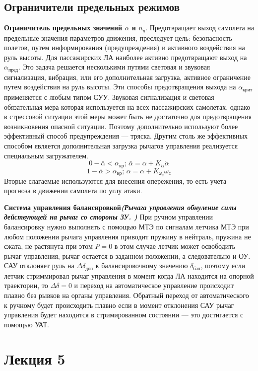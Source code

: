 \documentclass{article}
\begin{document}
\subsection{Ограничители предельных режимов}
\textbf{Ограничитель предельных значений $\alpha$ и $n_y$}.
Предотвращает выход самолета на предельные значения параметров движения,
преследует цель: безопасность полетов, путем информирования (предупреждения) и
активного воздействия на руль высоты.
Для пассажирских ЛА наиболее активно предотвращают выход на
$\alpha_\text{пред}$.
Это задача решается несколькими путями световая и звуковая сигнализация,
вибрация, или его дополнительная загрузка, активное ограничение путем
воздействия на руль высоты.
Эти способы предотвращения выхода на $\alpha_\text{крит}$ применяется с любым
типом СУУ. Звуковая сигнализация и световая обязательная мера которая
используется на всех пассажирских самолетах, однако в стрессовой ситуации этой
меры может быть не достаточно для предотвращения возникновения опасной ситуации.
Поэтому дополнительно используют более эффективный способ предупреждения ---
тряска. Другим столь же эффективных способом является дополнительная загрузка
рычагов управления реализуется специальным загружателем.
\[
    0 - \bar{\alpha} < \alpha_\text{кр}; \, \bar{\alpha} = \alpha +
    K_{\dot{\alpha}} \dot{\alpha}
\]
\[
    1 - \bar{\alpha} > \alpha_\text{кр}; \, \alpha = \alpha + K_{\omega_z}
    \omega_z
\]
Вторые слагаемые используются для внесения опережения, то есть учета прогноза в
движении самолета по углу атаки.

\textbf{Система управления балансировкой\emph{(Рычага управления обнуление силы
действующей на рычаг со стороны ЗУ. )}}
При ручном управлении балансировку нужно выполнять с помощью МТЭ по сигналам
летчика МТЭ при любом положении рычага управления приводит пружину в нейтраль,
пружина не сжата, не растянута при этом $P=0$ в этом случае летчик может
освободить рычаг управления, рычаг остается в заданном положении, а
следовательно и ОУ.
САУ отклоняет руль на $\Delta\delta_\text{доп}$ к балансировочному значению
$\delta_\text{бал}$, поэтому если летчик стриммировал рычаг управления в момент
когда ЛА находится на опорной траектории, то $\Delta\delta = 0$ и переход на
автоматическое управление происходит плавно без рывков на органы управления.
Обратный переход от автоматического к ручному будет происходить плавно если в
момент отклонения САУ рычаг управления будет находится в стримированном
состоянии --- это достигается с помощью УАТ.

\newpage
\section{Лекция 5}
\end{document}
